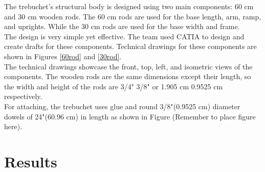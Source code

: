 \documentclass[12pt, titlepage]{article}
\begin{document}
    The trebuchet's structural body is designed using two main components: 60 cm and 30 cm wooden
    rods. The 60 cm rods are used for the base length, arm, ramp, and uprights. While 
    the 30 cm rods are used for the base width and frame. \\[10pt]
    The design is very simple yet effective. The team used CATIA to design 
    and create drafts for these components. Technical drawings for these 
    components are shown in Figures \ref{60rod} and \ref{30rod}.\\[10pt]
    The technical drawings showcase the front, top, left, and isometric views of the components.
    The wooden rods are the same dimensions except their length, so the width and height 
    of the rods are 3/4" 3/8" or 1.905 cm 0.9525 cm respectively.\\[10pt]
    For attaching, the trebuchet uses glue and round 3/8"(0.9525 cm) diameter dowels of 24"(60.96 cm) in length 
    as shown in Figure (Remember to place figure here).
    \newpage
    \section{Results}
\end{document}

